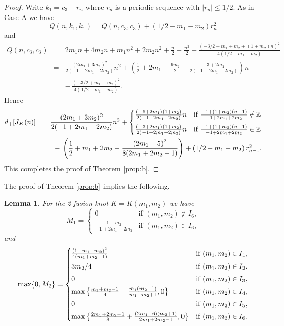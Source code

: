 \documentclass[11pt]{amsart}
\numberwithin{equation}{section}
\theoremstyle{plain}
\newtheorem{lemma}[theorem]{Lemma}
\theoremstyle{definition}
\def\BZ{\mathbb Z}
\begin{document}
\begin{proof}
Write $k_1 = c_3 + r_n$ where $r_n$ is a periodic sequence with $|r_n| \le 1/2$. As in Case A we have 
$$Q(n,k_1,k_1) = Q(n,c_3,c_3) + \left( 1/2-m_1-m_2 \right) r_n^2$$
and
\begin{eqnarray*}
Q(n,c_3,c_3) &=&  2 m_1 n + 4 m_2 n  + m_1 n^2 + 2 m_2 n^2 + \frac{n}{2} + \frac{n^2}{2} - \frac{\left( -3/2 + m_1 + m_2 + (1+m_2 ) n \right)^2}{4(1/2-m_1-m_2)} \\
&=& \frac {(2 m_1 + 3 m_2)^2} {2 (-1 + 2 m_1 + 2 m_2)} n^2 + \left( \frac{1}{2} + 2 m_1 + \frac{9m_2}{2} + \frac {-3 + 2 m_1} {2 (-1 + 2 m_1 + 2 m_2)} \right) n\\
&& - \, \frac{\left( -3/2 + m_1 + m_2  \right)^2}{4(1/2-m_1-m_2)} .
\end{eqnarray*} 
Hence 
\begin{eqnarray*}
d_+[J_K(n)] &=& \frac {(2 m_1 + 3 m_2)^2} {2 (-1 + 2 m_1 + 2 m_2)} n^2 + 
\begin{cases} \frac {(-5 + 2m_1)(1 + m_2)} {2 (-1 + 2 m_1 + 2 m_2)} n &\mbox{if } \frac {-1+(1 + m_2)(n-1)} {-1 + 2 m_1 + 2 m_2}  \notin \BZ \medskip \\ 
\frac {(-3 + 2 m_1)(1 + m_2)} {2(-1 + 2 m_1 + 2 m_2)}n & \mbox{if } \frac {-1+(1 + m_2)(n-1)} {-1 + 2 m_1 + 2 m_2}  \in  \BZ \end{cases} \\
&& - \, \left( \frac{1}{2} + m_1 + 2m_2 - \frac{\left( 2m_1 -5  \right)^2}{8(2m_1 + 2m_2 -1)} \right) + \left( 1/2-m_1-m_2 \right) r_{n-1}^2.
\end{eqnarray*}
This completes the proof of Theorem \ref{prop:b}.
\end{proof}


The proof of Theorem \ref{prop:b} implies the following.

\begin{lemma} \label{M}
For the 2-fusion knot $K=K(m_1, m_2)$ we have
$$
M_1 = \begin{cases}  0  & \mbox{if } (m_1, m_2) \notin I_6, 
\\ \frac {1 + m_2} {-1 + 2 m_1 + 2 m_2} & \mbox{if } (m_1, m_2) \in I_6,
\end{cases}
$$
and 
$$
\max\{0, M_2\} = \begin{cases} \frac{(1 - m_1 + m_2)^2}{4(m_1 + m_2 -1)} &\mbox{if } (m_1, m_2) \in I_1, 
\smallskip\\
3m_2/4 &\mbox{if } (m_1, m_2) \in I_2, 
\smallskip
\\ 0  & \mbox{if } (m_1, m_2) \in I_3, 
\smallskip
\\ \max \big\{  \frac{m_1 + m_2 -1}{4} + \frac{m_1 (m_2 - 1)}{m_1 + m_2 + 1}, 0 \big\}   & \mbox{if } (m_1, m_2) \in I_4, 
\smallskip
\\ 0  & \mbox{if } (m_1, m_2) \in I_5, 
\smallskip
\\ \max \big\{ \frac{2m_1 + 2m_2 -1}{8} + \frac{(2m_1-6) (m_2+1)}{2m_1 + 2m_2 - 1}, 0 \big\} & \mbox{if } (m_1, m_2) \in I_6.
\end{cases}
$$
\end{lemma}
 
\end{document}
